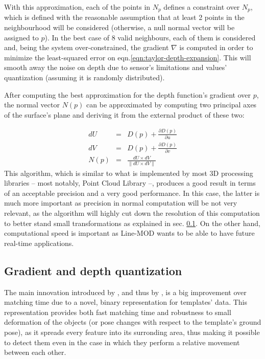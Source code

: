 With this approximation, each of the points in $N_p$ defines a
constraint over $N_p$, which is defined with the reasonable assumption
that at least 2 points in the neighbourhood will be considered
(otherwise, a null normal vector will be assigned to $p$). In the best
case of 8 valid neighbours, each of them is considered and, being the
system over-constrained, the
gradient $\nabla$ is computed in order to minimize the least-squared
error on eqn.\ref{eqn:taylor-depth-expansion}. This will smooth away
the noise on depth due to sensor's limitations and values'
quantization (assuming it is randomly distributed).

After computing the best approximation for the depth function's
gradient over $p$, the normal vector $N(p)$ can be approximated by computing
two principal axes of the surface's plane and deriving it from the
external product of these two:

\begin{eqnarray}
  dU & = & D(p)+\frac{\partial D(p)}{\partial u} \\
  dV & = & D(p)+\frac{\partial D(p)}{\partial v} \\
  N(p) & = & \frac{dU \times dV}{\lVert dU \times dV \rVert}
\end{eqnarray}
This algorithm, which is similar to what is implemented by most 3D
processing libraries -- most notably, Point Cloud Library --, produces
a good result in terms of an acceptable precision and a very good
performance. In this case, the latter is much more important as
precision in normal computation will be not very relevant, as the
algorithm will highly cut down the resolution of this computation to
better stand small transformations as explained in
sec. \ref{sec:linemod-quantization}. On the other hand, computational speed
is important as Line-MOD wants to be able to have future real-time applications.

\subsection{Gradient and depth quantization} \label{sec:linemod-quantization}
The main innovation introduced by \cite{linemod-origins}, and thus by
\cite{linemod-paper}, is a big improvement over matching time due to
a novel, binary representation for templates' data. This
representation provides both fast matching time and robustness to small
deformation of the objects (or pose changes with respect to the
template's ground pose), as it spreads every feature into its surronding
area, thus making it possible to detect them even in the case in which
they perform a relative movement between each other.

